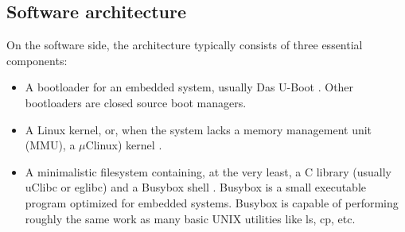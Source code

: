 \documentclass[conference]{IEEEtran}
\newcommand{\nota}[1]{}
\begin{document}
\subsection{Software architecture}

\nota {
En el lado software, la arquitectura consiste típicamente de tres componentes esenciales :
}

On the software side, the architecture typically consists of three essential components:

\nota {
\begin{itemize}
\item Un gestor de arranque (del inglés ``bootloader'') para un sistema embebido,
que generalmente es Das U-Boot \cite{uboot}. Si no se utiliza U-Boot entonces
es posible encontrar un gestor de arranque de código cerrado.
\item Un kernel Linux o uClinux en caso de ser un sistema sin una
unidad de manejo de memoria, MMU (del inglés ``Memory Management Unit''). 
\item Un sistema de archivos mínimo que contiene, al menos, una biblioteca de C
(generalmente uClibc o eglibc), y Busybox, el cual es un pequeño programa ejecutable,
optimizado para sistemas embebidos, que puede realizar las operaciones
de muchas de las utilidades  básicas de UNIX (ls, cp, etc.).
\end{itemize}
}

\begin{itemize}
\item A bootloader for an embedded system, usually Das U-Boot \cite{uboot}. Other bootloaders are closed source boot managers.
\item A Linux kernel, or, when the system lacks a memory management unit (MMU), a
$\mu$Clinux) kernel \cite{linux, uclinux}.
\item A minimalistic filesystem containing, at the very least, a C library (usually uClibc or eglibc) and a Busybox shell \cite{busybox}. Busybox is a small executable program optimized for embedded systems. Busybox is capable of performing roughly the same work as many basic UNIX utilities like ls, cp, etc.
\end{itemize}
\nota {
Algunas veces existe un cuarto componente de software, que son las aplicaciones
y controladores de hardware (del inglés ``drivers'') del fabricante.
Las aplicaciones muchas veces no son de interés, pero si los controladores.
Si existiesen controladores de código cerrado
entonces el trabajo de preparar un Linux embebido con soporte
para todo el hardware será difícil (debido a que no se tiene acceso
al código fuente). En nuestra experiencia con el ENTC-1000 no encontramos drivers
de código cerrado, por lo que este punto está fuera del alcance de este artículo. 
}
\end{document}

